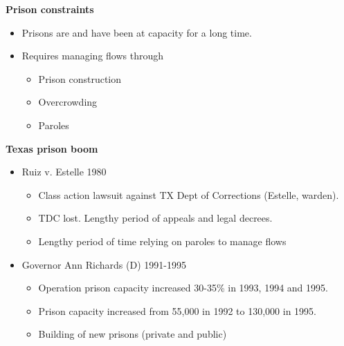 \documentclass[notes=show]{beamer}
\begin{document}
\begin{frame}[plain]
\begin{center}
\textbf{Prison constraints}
\end{center}

	
	\begin{itemize}
	\item Prisons are and have been at capacity for a long time.  
	\item Requires managing flows through
		\begin{itemize}
		\item Prison construction
		\item Overcrowding
		\item Paroles
		\end{itemize}
	\end{itemize}
\end{frame}



\begin{frame}[plain]
\begin{center}
\textbf{Texas prison boom}
\end{center}

	
	\begin{itemize}
	\item Ruiz v. Estelle 1980  
		\begin{itemize}
		\item Class action lawsuit against TX Dept of Corrections (Estelle, warden). 
		\item TDC lost.  Lengthy period of appeals and legal decrees.  
		\item Lengthy period of time relying on paroles to manage flows
		\end{itemize}
	\item Governor Ann Richards (D) 1991-1995
		\begin{itemize}
		\item Operation prison capacity increased 30-35\% in 1993, 1994 and 1995. 
		\item Prison capacity increased from 55,000 in 1992 to 130,000 in 1995.  
		\item Building of new prisons (private and public)
		\end{itemize} 
	\end{itemize}
\end{frame}
\end{document}
